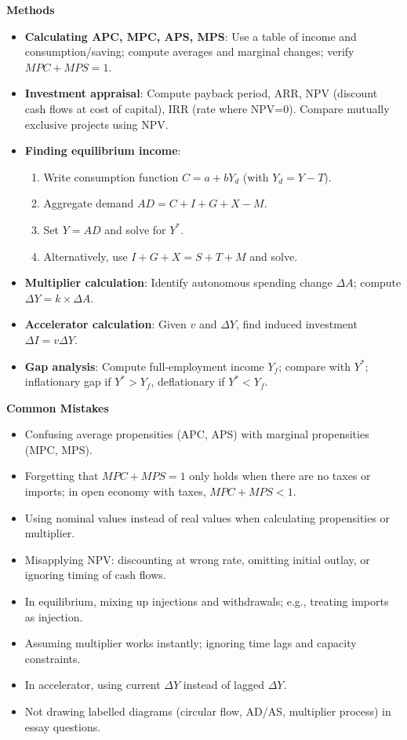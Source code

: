 \documentclass[11pt]{article}
\begin{document}
\begin{bilan}
\textbf{Methods}
\begin{itemize}
\item \textbf{Calculating APC, MPC, APS, MPS}: Use a table of income and consumption/saving; compute averages and marginal changes; verify $MPC+MPS=1$.
\item \textbf{Investment appraisal}: Compute payback period, ARR, NPV (discount cash flows at cost of capital), IRR (rate where NPV=0). Compare mutually exclusive projects using NPV.
\item \textbf{Finding equilibrium income}: 
  \begin{enumerate}
  \item Write consumption function $C = a + bY_d$ (with $Y_d = Y - T$).
  \item Aggregate demand $AD = C + I + G + X - M$.
  \item Set $Y = AD$ and solve for $Y^*$.
  \item Alternatively, use $I+G+X = S+T+M$ and solve.
  \end{enumerate}
\item \textbf{Multiplier calculation}: Identify autonomous spending change $\Delta A$; compute $\Delta Y = k \times \Delta A$.
\item \textbf{Accelerator calculation}: Given $v$ and $\Delta Y$, find induced investment $\Delta I = v \Delta Y$.
\item \textbf{Gap analysis}: Compute full-employment income $Y_f$; compare with $Y^*$; inflationary gap if $Y^* > Y_f$, deflationary if $Y^* < Y_f$.
\end{itemize}

\textbf{Common Mistakes}
\begin{itemize}
\item Confusing average propensities (APC, APS) with marginal propensities (MPC, MPS).
\item Forgetting that $MPC+MPS=1$ only holds when there are no taxes or imports; in open economy with taxes, $MPC+MPS < 1$.
\item Using nominal values instead of real values when calculating propensities or multiplier.
\item Misapplying NPV: discounting at wrong rate, omitting initial outlay, or ignoring timing of cash flows.
\item In equilibrium, mixing up injections and withdrawals; e.g., treating imports as injection.
\item Assuming multiplier works instantly; ignoring time lags and capacity constraints.
\item In accelerator, using current $\Delta Y$ instead of lagged $\Delta Y$.
\item Not drawing labelled diagrams (circular flow, AD/AS, multiplier process) in essay questions.
\end{itemize}


\end{bilan}
\end{document}
